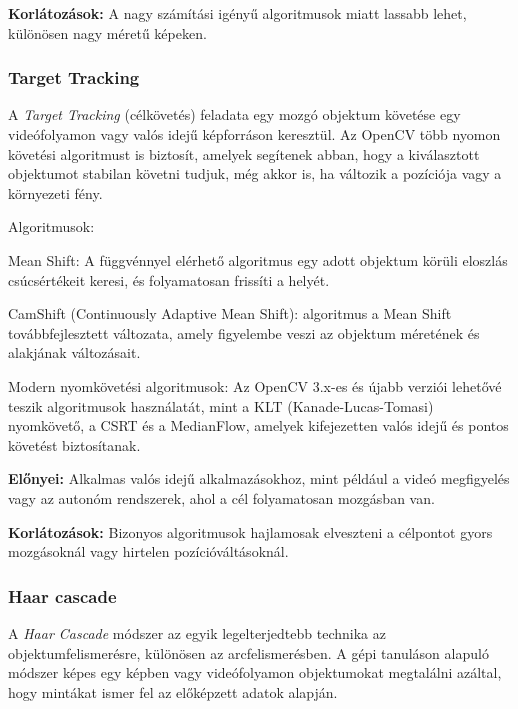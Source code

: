 \documentclass[12pt,a4paper]{article}
\newcommand{\code}[1]{\tcbox{\texttt{#1}}}
\begin{document}
\textbf{Korlátozások:} A nagy számítási igényű algoritmusok miatt lassabb lehet, különösen nagy méretű képeken.

\subsubsection{Target Tracking} \label{sec:soft_target}

A \textsl{Target Tracking} (célkövetés) feladata egy mozgó objektum követése egy videófolyamon vagy valós idejű képforráson keresztül. Az OpenCV több nyomon követési algoritmust is biztosít, amelyek segítenek abban, hogy a kiválasztott objektumot stabilan követni tudjuk, még akkor is, ha változik a pozíciója vagy a környezeti fény.

Algoritmusok:
\begin{list}{-}{}
	\item Mean Shift: A \code{cv2.meanShift()} függvénnyel elérhető algoritmus egy adott objektum körüli eloszlás csúcsértékeit keresi, és folyamatosan frissíti a helyét.
	\item CamShift (Continuously Adaptive Mean Shift): \code{A cv2.CamShift()} algoritmus a Mean Shift továbbfejlesztett változata, amely figyelembe veszi az objektum méretének és alakjának változásait.
	\item Modern nyomkövetési algoritmusok: Az OpenCV 3.x-es és újabb verziói lehetővé teszik algoritmusok használatát, mint a KLT (Kanade-Lucas-Tomasi) nyomkövető, a CSRT és a MedianFlow, amelyek kifejezetten valós idejű és pontos követést biztosítanak.
\end{list}

\textbf{Előnyei:} Alkalmas valós idejű alkalmazásokhoz, mint például a videó megfigyelés vagy az autonóm rendszerek, ahol a cél folyamatosan mozgásban van.

\textbf{Korlátozások:} Bizonyos algoritmusok hajlamosak elveszteni a célpontot gyors mozgásoknál vagy hirtelen pozícióváltásoknál.
\subsubsection{Haar cascade} \label{sec:soft_haar}

A \textsl{Haar Cascade} módszer az egyik legelterjedtebb technika az objektumfelismerésre, különösen az arcfelismerésben. A gépi tanuláson alapuló módszer képes egy képben vagy videófolyamon objektumokat megtalálni azáltal, hogy mintákat ismer fel az előképzett adatok alapján.\\
\end{document}
